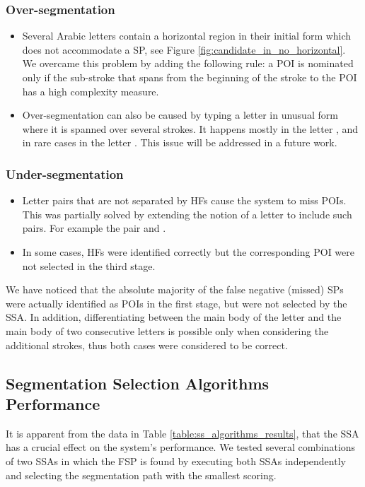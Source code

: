 \documentclass[10pt, conference, compsocconf]{IEEEtran}
\begin{document}
\subsubsection{Over-segmentation}
\begin{itemize}
\item Several Arabic letters contain a horizontal region in their initial form which does not accommodate a SP, see Figure \ref{fig:candidate_in_no_horizontal}. 
We overcame this problem by adding the following rule: a POI is nominated only if the sub-stroke that spans from the beginning of the stroke to the POI has a high complexity measure.
\item Over-segmentation can also be caused by typing a letter in unusual form where it is spanned over several strokes. 
It happens mostly in the letter ,  and in rare cases in the letter . This issue will be addressed in a future work.
\end{itemize}

\subsubsection{Under-segmentation}
\begin{itemize}
\item Letter pairs that are not separated by HFs cause the system to miss POIs. This was partially solved by extending the notion of a letter to include such pairs. For example the pair  and  .
\item In some cases, HFs were identified correctly but the corresponding POI were not selected in the third stage.
\end{itemize}

We have noticed that the absolute majority of the false negative (missed) SPs were actually identified as POIs in the first stage, but were not selected by the SSA.
In addition, differentiating between the main body of the letter  and the main body of two consecutive  letters is possible only when considering the additional strokes, thus both cases were considered to be correct.

\subsection{Segmentation Selection Algorithms Performance}
\label{subsec:ssa_performance}
It is apparent from the data in Table \ref{table:ss_algorithms_results}, that the SSA has a crucial effect on the system's performance. 
We tested several combinations of two SSAs in which the FSP is found by executing both SSAs independently and selecting the segmentation path with the smallest scoring. 
\end{document}
